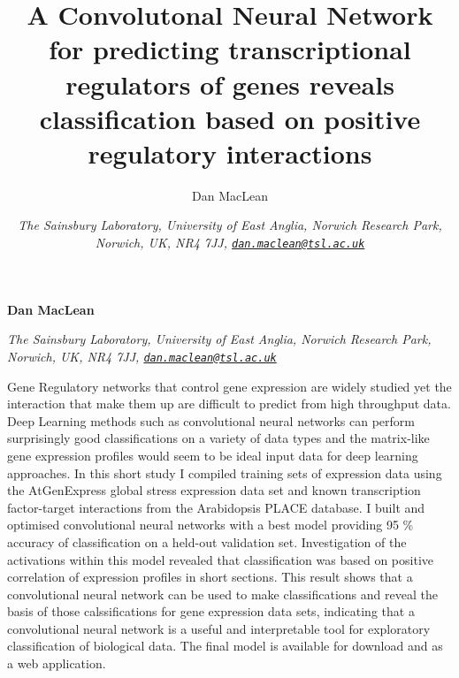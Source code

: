 \documentclass[12pt,a4paper,]{article}
\title{A Convolutonal Neural Network for predicting transcriptional regulators of genes reveals classification based on positive regulatory interactions  }
\author{\Large Dan MacLean\vspace{0.05in} \newline\normalsize\emph{}   \and \Large \vspace{0.05in} \newline\normalsize\emph{The Sainsbury Laboratory, University of East Anglia, Norwich Research Park, Norwich, UK, NR4 7JJ, \href{mailto:dan.maclean@tsl.ac.uk}{\nolinkurl{dan.maclean@tsl.ac.uk}}}  }
\date{}
\newcommand*{\authorfont}{\fontfamily{phv}\selectfont}
\renewenvironment{abstract}
 {{%
    \setlength{\leftmargin}{0mm}
    \setlength{\rightmargin}{\leftmargin}%
  }%
  \relax}
 {\endlist}
\begin{document}
	
%

{%
\setlength{\parindent}{0pt}
\thispagestyle{plain}
{\fontsize{18}{20}\selectfont\raggedright 
\maketitle  %

}

{
   \vskip 13.5pt\relax \normalsize\fontsize{11}{12} 
\textbf{\authorfont Dan MacLean} \hskip 15pt \emph{\small }   \par \textbf{\authorfont } \hskip 15pt \emph{\small The Sainsbury Laboratory, University of East Anglia, Norwich Research Park, Norwich, UK, NR4 7JJ, \href{mailto:dan.maclean@tsl.ac.uk}{\nolinkurl{dan.maclean@tsl.ac.uk}}}   

}

}








\begin{abstract}

    \hbox{\vrule height .2pt width 39.14pc}

    \vskip 8.5pt %

\noindent Gene Regulatory networks that control gene expression are widely studied yet the interaction that make them up are difficult to predict from high throughput data. Deep Learning methods such as convolutional neural networks can perform surprisingly good classifications on a variety of data types and the matrix-like gene expression profiles would seem to be ideal input data for deep learning approaches. In this short study I compiled training sets of expression data using the AtGenExpress global stress expression data set and known transcription factor-target interactions from the Arabidopsis PLACE database. I built and optimised convolutional neural networks with a best model providing 95 \% accuracy of classification on a held-out validation set. Investigation of the activations within this model revealed that classification was based on positive correlation of expression profiles in short sections. This result shows that a convolutional neural network can be used to make classifications and reveal the basis of those calssifications for gene expression data sets, indicating that a convolutional neural network is a useful and interpretable tool for exploratory classification of biological data. The final model is available for download and as a web application.


    \hbox{\vrule height .2pt width 39.14pc}


\end{abstract}
\end{document}

